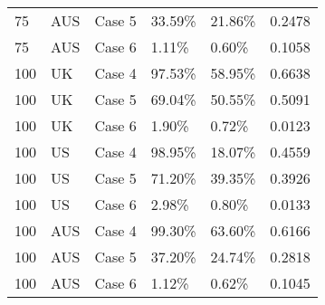 \begin{table}[ht]
\begin{tabular}{llllll}
  75 & AUS & Case 5 & 33.59\% & 21.86\% & 0.2478 \\ 
  75 & AUS & Case 6 & 1.11\% & 0.60\% & 0.1058 \\ 
  100 & UK & Case 4 & 97.53\% & 58.95\% & 0.6638 \\ 
  100 & UK & Case 5 & 69.04\% & 50.55\% & 0.5091 \\ 
  100 & UK & Case 6 & 1.90\% & 0.72\% & 0.0123 \\ 
  100 & US & Case 4 & 98.95\% & 18.07\% & 0.4559 \\ 
  100 & US & Case 5 & 71.20\% & 39.35\% & 0.3926 \\ 
  100 & US & Case 6 & 2.98\% & 0.80\% & 0.0133 \\ 
  100 & AUS & Case 4 & 99.30\% & 63.60\% & 0.6166 \\ 
  100 & AUS & Case 5 & 37.20\% & 24.74\% & 0.2818 \\ 
  100 & AUS & Case 6 & 1.12\% & 0.62\% & 0.1045 \\ 
   \hline
\end{tabular}
\end{table}
